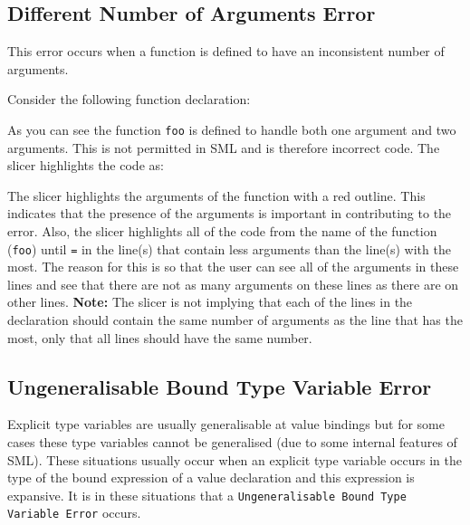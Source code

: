 \documentclass{report}
\begin{document}
\begin{itemize}
\newpage

\subsection{Different Number of Arguments Error}

\subitem This error occurs when a function is defined to have an
inconsistent number of arguments.

Consider the following function declaration:


As you can see the function \texttt{foo} is defined to handle
both one argument and two arguments. This is not permitted in SML and
is therefore incorrect code. The slicer highlights the code as:

The slicer highlights the arguments of the function with a red
outline. This indicates that the presence of the arguments is
important in contributing to the error. Also, the slicer highlights
all of the code from the name of the function (\texttt{foo})
until \texttt{=} in the line(s) that contain less arguments
than the line(s) with the most. The reason for this is so that the
user can see all of the arguments in these lines and see that there
are not as many arguments on these lines as there are on other lines.
\textbf{Note:} The slicer is not implying that each of the lines in
the declaration should contain the same number of arguments as the
line that has the most, only that all lines should have the same number.

\subsection{Ungeneralisable Bound Type Variable Error}

\subitem Explicit type variables are usually generalisable at value
bindings but for some cases these type variables cannot be generalised
(due to some internal features of SML). These situations usually occur
when an explicit type variable occurs in the type of the bound
expression of a value declaration and this expression is expansive. It is
in these situations that a \texttt{Ungeneralisable Bound Type
  Variable Error} occurs.


\end{itemize}
\end{document}
